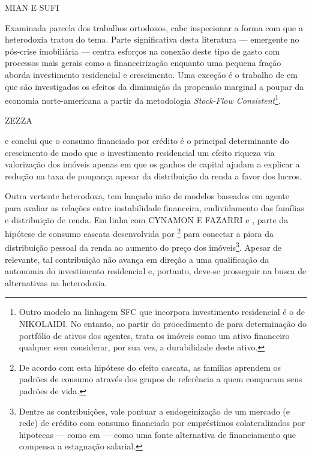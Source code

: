 MIAN E SUFI

Examinada parcela dos trabalhos ortodoxos, cabe inspecionar a forma com que a heterodoxia tratou do tema. 
Parte significativa desta literatura  --- emergente no pós-crise imobiliária --- centra esforços na conexão deste tipo de gasto com processos mais gerais como a financeirização \cites{aalbers_financialization_2008}{bibow_financialization_2010} enquanto uma pequena fração aborda investimento residencial e crescimento.
Uma exceção é o trabalho de \textcite{zezza_u.s._2008} em que são investigados os efeitos da diminuição da propensão marginal a poupar da economia norte-americana a partir da metodologia \textit{Stock-Flow Consistent}\footnote{
	Outro modelo na linhagem SFC que incorpora investimento residencial é o de NIKOLAIDI.
	No entanto, ao partir do procedimento de \textcite{godley_money_1999} para determinação do portfólio de ativos dos agentes, trata os imóveis como um ativo financeiro qualquer sem considerar, por sua vez, a durabilidade deste ativo.
}.

ZEZZA

 e conclui que o consumo financiado por crédito é o principal determinante do crescimento de modo que o investimento residencial um efeito riqueza via valorização dos imóveis apenas em que os ganhos de capital ajudam a explicar a redução na taxa de poupança apesar da distribuição da renda a favor dos lucros. 

Outra vertente heterodoxa, tem lançado mão de modelos baseados em agente para avaliar as relações entre instabilidade financeira, endividamento das famílias e distribuição de renda.
Em linha com 
CYNAMON E FAZARRI e \textcite{erlingsson_integrating_2013}, \textcite{cardaci_inequality_2018} parte da hipótese de consumo cascata desenvolvida por \textcite{frank_expenditure_2014}\footnote{
	De acordo com esta hipótese do efeito cascata, as famílias aprendem os padrões de consumo através dos grupos de referência a quem comparam seus padrões de vida.
} para conectar a piora da distribuição pessoal da renda ao aumento do preço dos imóveis\footnote{Dentre as contribuições, vale pontuar a endogeinização de um mercado (e rede) de crédito com consumo financiado por empréstimos colateralizados por hipotecas --- como em \textcite{mian_house_2011} --- como uma fonte alternativa de financiamento que compensa a estagnação salarial.}.
Apesar de relevante, tal contribuição não avança em direção a uma qualificação da autonomia do investimento residencial e, portanto, deve-se prosseguir na busca de alternativas na heterodoxia.

